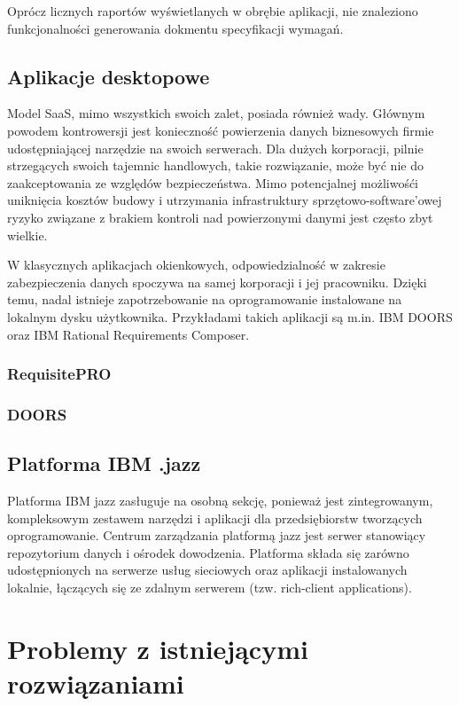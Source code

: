         Oprócz licznych raportów wyświetlanych w obrębie aplikacji, nie znaleziono funkcjonalności generowania dokmentu specyfikacji wymagań. 

    \subsection{Aplikacje desktopowe}

      Model SaaS, mimo wszystkich swoich zalet, posiada również wady. Głównym powodem kontrowersji jest konieczność powierzenia danych biznesowych firmie udostępniającej narzędzie na swoich serwerach. Dla dużych korporacji, pilnie strzegących swoich tajemnic handlowych, takie rozwiązanie, może być nie do zaakceptowania ze względów bezpieczeństwa. Mimo potencjalnej możliwośći uniknięcia kosztów budowy i utrzymania infrastruktury sprzętowo-software'owej ryzyko związane z brakiem kontroli nad powierzonymi danymi jest często zbyt wielkie. 

      W klasycznych aplikacjach okienkowych, odpowiedzialność w zakresie zabezpieczenia danych spoczywa na samej korporacji i jej pracowniku. Dzięki temu, nadal istnieje zapotrzebowanie na oprogramowanie instalowane na lokalnym dysku użytkownika. Przykładami takich aplikacji są m.in. IBM DOORS oraz IBM Rational Requirements Composer.

      \subsubsection{RequisitePRO}
      \subsubsection{DOORS}

    \subsection{Platforma IBM .jazz}

      Platforma IBM jazz zasługuje na osobną sekcję, ponieważ jest zintegrowanym, kompleksowym zestawem narzędzi i aplikacji dla przedsiębiorstw tworzących oprogramowanie. Centrum zarządzania platformą jazz jest serwer stanowiący repozytorium danych i ośrodek dowodzenia. Platforma składa się zarówno udostępnionych na serwerze usług sieciowych oraz aplikacji instalowanych lokalnie, łączących się ze zdalnym serwerem (tzw. rich-client applications). 

  \section{Problemy z istniejącymi rozwiązaniami}

